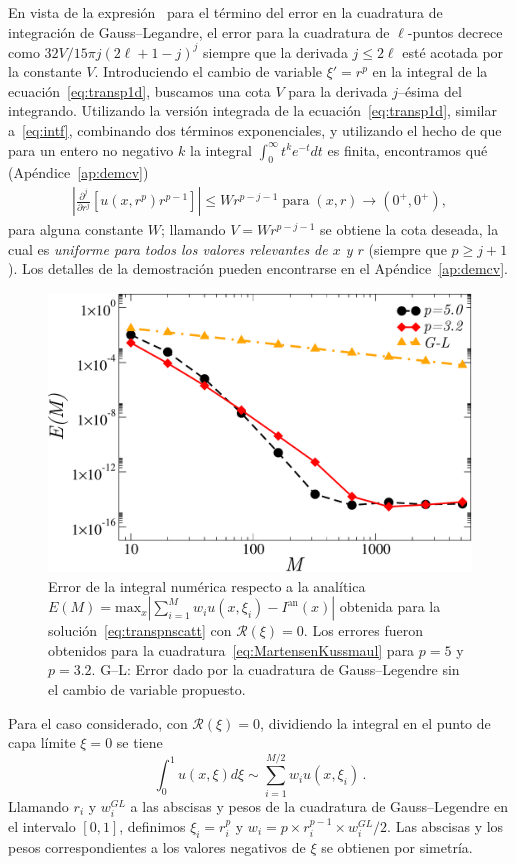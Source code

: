 En vista de la expresión~\cite[p. 77]{Trefethen2008} 
para el término del error en la cuadratura de integración 
de Gauss--Legandre, el error para la cuadratura de $\ell$-puntos 
decrece como $32V/15\pi j (2\ell+1-j)^j$ siempre que la derivada 
$j \leq 2\ell$ esté acotada por la constante $V$. 
Introduciendo el cambio de variable  $\xi'=r^p$ en la integral 
de la ecuación~\eqref{eq:transp1d}, buscamos una cota $V$ 
para la derivada $j$--ésima del integrando. 
Utilizando la versión integrada de la ecuación~\eqref{eq:transp1d}, 
similar a~\eqref{eq:intf}, combinando dos términos exponenciales, 
y utilizando el hecho de que para un entero no negativo $k$ 
la integral $\int_0^\infty t^k e^{-t} dt$ es finita, 
encontramos qué (Apéndice~\ref{ap:demcv})
\begin{equation}
\begin{split}
\left | \frac{\partial^j }{\partial r^j}\left[ u(x,r^p) r^{p-1}\right]
\right|\leq W r^{p-j-1}\; \text{para}  \; (x,r) \to (0^+,0^+),
\end{split}
\label{eq:boundedderblayer}
\end{equation}
para alguna constante $W$; llamando $V = W r^{p-j-1}$  
se obtiene la cota deseada, la cual es {\em uniforme 
para todos los valores relevantes de $x$ y $r$ } (siempre que 
$p \ge j+1$). Los 
detalles de la demostración pueden encontrarse en el Apéndice~\ref{ap:demcv}.
\begin{figure}[H]
\centering
  \includegraphics[width=0.5\linewidth]{figuras/quads.pdf}
  \caption{Error de la integral numérica respecto a la 
  analítica $E(M)=\text{max}_x |\sum_{i=1}^M w_i u(x,\xi_i)-I^{\text{an}}(x)|$
  obtenida para la solución~\eqref{eq:transpnscatt} con $\mathcal{R}(\xi)=0$. 
  Los errores fueron obtenidos para la cuadratura~\eqref{eq:MartensenKussmaul} 
  para $p=5$ y $p=3.2$. G--L: 
  Error dado por la cuadratura de Gauss--Legendre sin el cambio de variable propuesto.}
 \label{fig:intconvs}
\end{figure}
Para el caso considerado, con $\mathcal{R}(\xi)=0$, 
dividiendo la integral en el punto de capa límite $\xi=0$ se tiene 
\begin{equation}
\int_{0}^{1} u(x,\xi) d\xi \sim \sum_{i=1}^{M/2} w_i u(x,\xi_i) \, .
\label{eq:MartensenKussmaul}
\end{equation}
Llamando $r_i$ y $w_i^{GL}$ a las abscisas y pesos de la 
cuadratura de Gauss--Legendre en el intervalo $[0,1]$, 
definimos $\xi_i=r_i^p$ y $w_i= p \times r_i^{p-1} \times w_i^{GL}/2$. 
Las abscisas y los pesos correspondientes a los valores negativos 
de $\xi$ se obtienen por simetría. 

